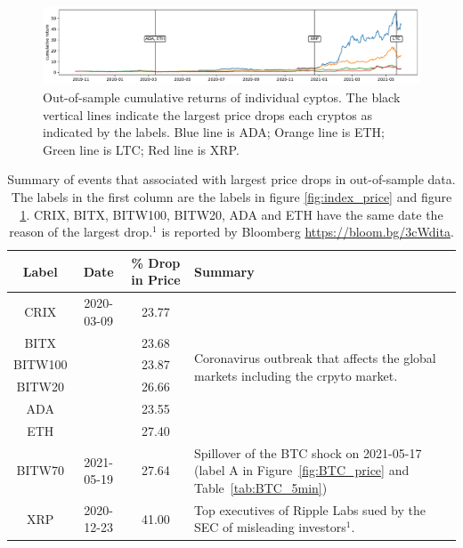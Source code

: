 \begin{figure}[t]
\includegraphics[width=\textwidth]{_pics/individualCoins_price.pdf}
  \caption{Out-of-sample cumulative returns of individual cyptos.
  The black vertical lines indicate the largest price drops each
  cryptos as indicated by the labels.
    \textcolor{plt1}{Blue line} is ADA;
  \textcolor{plt2}{Orange line} is ETH;
  \textcolor{plt3}{Green line} is LTC;
  \textcolor{plt4}{Red line} is XRP.}

\label{fig:individualCoins_price}
\end{figure}

\begin{table}[t]
    \centering
      \begin{tabularx}{.8\textwidth}{cccX}
        \toprule
        Label &  Date & \% Drop in Price &  Summary\\
        \midrule
        CRIX    &2020-03-09 & 23.77 &
        \multirow[t]{6}{\hsize}{Coronavirus outbreak that affects the
          global markets including the crpyto market.}\\ 
        BITX    & & 23.68 &  \\
        BITW100 & & 23.87 &  \\
        BITW20  & & 26.66 &  \\
        ADA     & & 23.55 &  \\
        ETH     & & 27.40 &  \\
        BITW70  & 2021-05-19 & 27.64 & Spillover of the BTC shock on
        2021-05-17 (label A in Figure~\ref{fig:BTC_price} and
        Table~\ref{tab:BTC_5min})\\ 
        XRP     & 2020-12-23 & 41.00 & Top executives of Ripple Labs
        sued by the SEC of misleading investors$^1$. \\ 
        \bottomrule
      \end{tabularx}
        \caption{Summary of events that associated with largest price drops in out-of-sample data.
        The labels in the first column are the labels in figure \ref{fig:index_price} and figure \ref{fig:individualCoins_price}.
        CRIX, BITX, BITW100, BITW20, ADA and ETH have the same date
        the reason of the largest drop.$^1$ is reported by Bloomberg
        \url{https://bloom.bg/3cWdita}.} 
        \label{tab:All_min}
  \end{table}
\clearpage
\newpage
